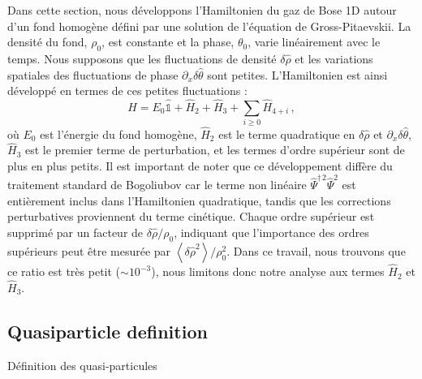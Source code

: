 \documentclass[aps,prd,notitlepage,amsfonts,amssymb,amsmath,nofootinbib,superscriptaddress,longbibliography]{revtex4-2}
\newcommand{\trad}[1]{\textcolor{tradcolor}{#1}}
\newcommand{\resumefr}[1]{\textcolor{resumecolor}{#1}}
\begin{document}
\resumefr{
Dans cette section, nous développons l'Hamiltonien du gaz de Bose 1D autour d'un fond homogène défini par une solution de l'équation de Gross-Pitaevskii. La densité du fond, $\rho_0$, est constante et la phase, $\theta_0$, varie linéairement avec le temps. Nous supposons que les fluctuations de densité $\delta \hat{\rho}$ et les variations spatiales des fluctuations de phase $\partial_x \delta \hat{\theta}$ sont petites. L'Hamiltonien est ainsi développé en termes de ces petites fluctuations :
\[
\hat{H} = E_{0} \hat{\mathds{1}} + \hat{H}_{2} + \hat{H}_{3} + \sum_{i \geq 0} \hat{H}_{4+i} \, ,
\]
où $E_{0}$ est l'énergie du fond homogène, $\hat{H}_2$ est le terme quadratique en $\delta \hat{\rho}$ et $\partial_x \delta \hat{\theta}$, $\hat{H}_3$ est le premier terme de perturbation, et les termes d'ordre supérieur sont de plus en plus petits.
Il est important de noter que ce développement diffère du traitement standard de Bogoliubov car le terme non linéaire $\hat{\Psi}^{\dagger \, 2} \hat{\Psi}^2$ est entièrement inclus dans l'Hamiltonien quadratique, tandis que les corrections perturbatives proviennent du terme cinétique. Chaque ordre supérieur est supprimé par un facteur de $\delta\hat{\rho}/\rho_0$, indiquant que l'importance des ordres supérieurs peut être mesurée par $\left\langle \delta\hat{\rho}^{2}\right\rangle / \rho_{0}^{2}$. Dans ce travail, nous trouvons que ce ratio est très petit ($\sim 10^{-3}$), nous limitons donc notre analyse aux termes $\hat{H}_2$ et $\hat{H}_3$.
}


\subsection{Quasiparticle definition}
\trad{Définition des quasi-particules}
\end{document}

